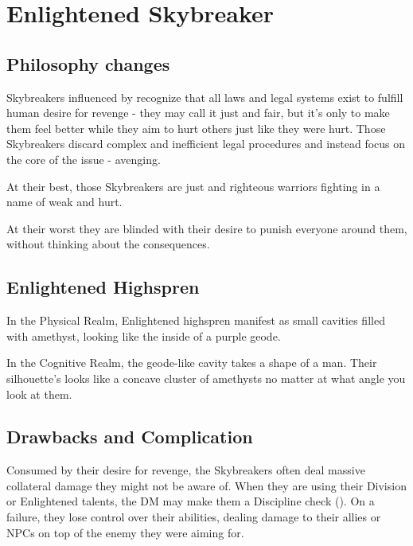 \newpage
\section{Enlightened Skybreaker}


\subsection{Philosophy changes}

Skybreakers influenced by \npcSjaAnat{} recognize that all laws and legal systems exist to fulfill human desire for revenge - they may call it just and fair, but it's only to make them feel better while they aim to hurt others just like they were hurt. Those Skybreakers discard complex and inefficient legal procedures and instead focus on the core of the issue - avenging.

At their best, those Skybreakers are just and righteous warriors fighting in a name of weak and hurt.

At their worst they are blinded with their desire to punish everyone around them, without thinking about the consequences.

\subsection{Enlightened Highspren}

In the Physical Realm, Enlightened highspren manifest as small cavities filled with amethyst, looking like the inside of a purple geode.

In the Cognitive Realm, the geode-like cavity takes a shape of a man. Their silhouette's looks like a concave cluster of amethysts no matter at what angle you look at them.

\subsection{Drawbacks and Complication}

Consumed by their desire for revenge, the Skybreakers often deal massive collateral damage they might not be aware of. When they are using their Division or Enlightened talents, the DM may make them a Discipline check (\corruptedResistanceDC{}). On a failure, they lose control over their abilities, dealing damage to their allies or NPCs on top of the enemy they were aiming for.

